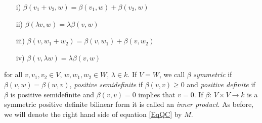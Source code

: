 \begin{enumerate}
	\item [i)] $\beta(v_1+v_2,w) = \beta(v_1,w) + \beta(v_2,w)  $
	\item  [ii)]$\beta(\lambda v,w)= \lambda \beta(v,w) $
	\item [iii)]$ \beta(v,w_1+w_2) = \beta(v,w_1)+ \beta(v,w_2) $
	\item [iv)]$ \beta(v,\lambda w) = \lambda\beta(v,w) $
\end{enumerate}
for all $ v,v_1,v_2 \in V, \, w,w_1,w_2 \in W, \, \lambda \in k $. 
If $ V = W $, we call $ \beta $ {\itshape symmetric} if $ \beta(v,w) = \beta(w,v) $, {\itshape positive semidefinite} if 
$ \beta(v,v) \ge 0 $ and {\itshape positive definite} if $ \beta $ is positive semidefinite and $ \beta(v,v)= 0 $ implies that $ v = 0 $. 
If $ \beta: \, V \times V \to k $ is a symmetric positive definite bilinear form it is called an {\itshape inner product}.
As before, we will denote the right hand side of equation \ref{EqQC} by $ M $.

